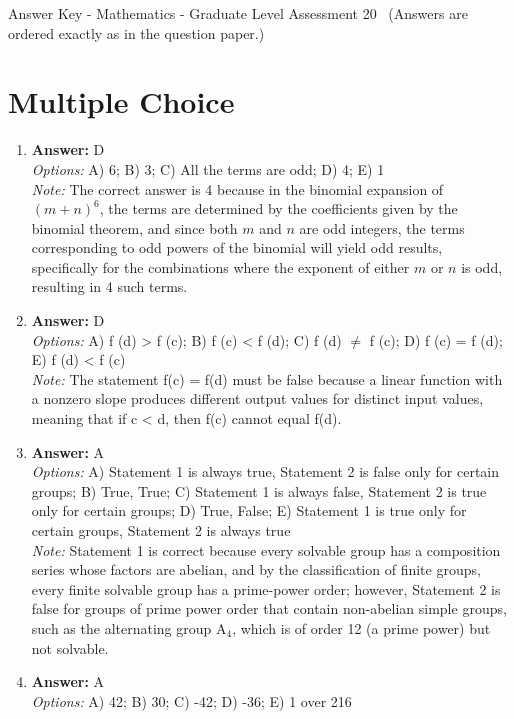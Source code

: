 \documentclass[12pt]{article}
\begin{document}
\begin{center}
Answer Key - Mathematics - Graduate Level Assessment 20 \
\small (Answers are ordered exactly as in the question paper.)
\end{center}

\section*{Multiple Choice}
\begin{enumerate}[label=\arabic*.]
\item \textbf{Answer:} D
\\ \textit{Options:} A) 6; B) 3; C) All the terms are odd; D) 4; E) 1
\\ \textit{Note:} The correct answer is 4 because in the binomial expansion of $(m+n)^6$, the terms are determined by the coefficients given by the binomial theorem, and since both $m$ and $n$ are odd integers, the terms corresponding to odd powers of the binomial will yield odd results, specifically for the combinations where the exponent of either $m$ or $n$ is odd, resulting in 4 such terms.
\item \textbf{Answer:} D
\\ \textit{Options:} A) f (d) \textgreater{} f (c); B) f (c) \textless{} f (d); C) f (d) \ensuremath{\neq} f (c); D) f (c) = f (d); E) f (d) \textless{} f (c)
\\ \textit{Note:} The statement f(c) = f(d) must be false because a linear function with a nonzero slope produces different output values for distinct input values, meaning that if c \textless{} d, then f(c) cannot equal f(d).
\item \textbf{Answer:} A
\\ \textit{Options:} A) Statement 1 is always true, Statement 2 is false only for certain groups; B) True, True; C) Statement 1 is always false, Statement 2 is true only for certain groups; D) True, False; E) Statement 1 is true only for certain groups, Statement 2 is always true
\\ \textit{Note:} Statement 1 is correct because every solvable group has a composition series whose factors are abelian, and by the classification of finite groups, every finite solvable group has a prime-power order; however, Statement 2 is false for groups of prime power order that contain non-abelian simple groups, such as the alternating group A$_{4}$, which is of order 12 (a prime power) but not solvable.
\item \textbf{Answer:} A
\\ \textit{Options:} A) 42; B) 30; C) -42; D) -36; E) 1 over 216

\end{enumerate}
\end{document}
